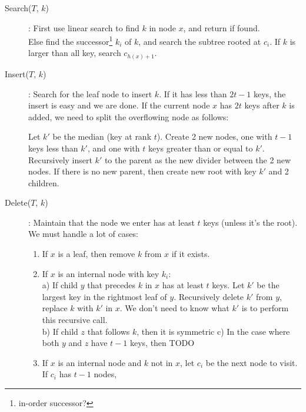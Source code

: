 \begin{description}
    \item[Search($T$, $k$)]: First use linear search to find $k$ in node $x$, and return if found. \\
    Else find the successor\footnote{in-order successor?} $k_i$ of $k$, and search the subtree rooted at $c_i$. If $k$ is larger than all key, search $c_{h(x) + 1}$.
    \item[Insert($T$, $k$)]: Search for the leaf node to insert $k$. If it has less than $2t - 1$ keys, the insert is easy and we are done. If the current node $x$ has $2t$ keys after $k$ is added, we need to split the overflowing node as follows:

    Let $k'$ be the median (key at rank $t$). Create 2 new nodes, one with $t-1$ keys less than $k'$, and one with $t$ keys greater than or equal to $k'$. Recursively insert $k'$ to the parent as the new divider between the 2 new nodes. If there is no new parent, then create new root with key $k'$ and 2 children. 

    \item[Delete($T$, $k$)]: Maintain that the node we enter has at least $t$ keys (unless it's the root). We must handle a lot of cases:
    \begin{enumerate}
    \item If $x$ is a leaf, then remove $k$ from $x$ if it exists.
        \item If $x$ is an internal node with key $k_i$: \\
        a) If child $y$ that precedes $k$ in $x$ has at least $t$ keys. Let $k'$ be the largest key in the rightmost leaf of $y$. Recursively delete $k'$ from $y$, replace $k$ with $k'$ in $x$. We don't need to know what $k'$ is to perform this recursive call. \\
        b) If child $z$ that follows $k$, then it is symmetric
        c) In the case where both $y$ and $z$ have $t-1$ keys, then TODO
        \item If $x$ is an internal node and $k$ not in $x$, let $c_i$ be the next node to visit. If $c_i$ has $t-1$ nodes,  
    \end{enumerate}
\end{description}
